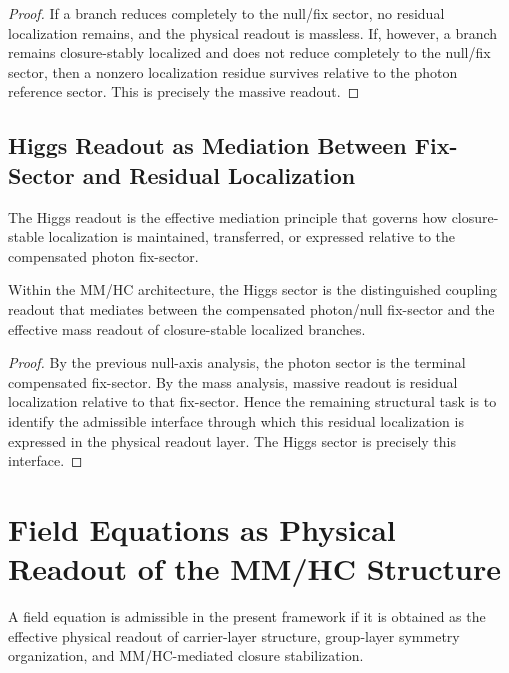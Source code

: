 \begin{proof}
If a branch reduces completely to the null/fix sector, no residual
localization remains, and the physical readout is massless. If, however, a
branch remains closure-stably localized and does not reduce completely to the
null/fix sector, then a nonzero localization residue survives relative to the
photon reference sector. This is precisely the massive readout.
\end{proof}

\subsection{Higgs Readout as Mediation Between Fix-Sector and Residual Localization}
\label{subsec:higgs-fix-localization}

\begin{definition}
\label{def:higgs-mediation}
The Higgs readout is the effective mediation principle that governs how
closure-stable localization is maintained, transferred, or expressed relative
to the compensated photon fix-sector.
\end{definition}

\begin{theorem}
\label{thm:higgs-role-refined}
Within the MM/HC architecture, the Higgs sector is the distinguished coupling
readout that mediates between the compensated photon/null fix-sector and the
effective mass readout of closure-stable localized branches.
\end{theorem}

\begin{proof}
By the previous null-axis analysis, the photon sector is the terminal
compensated fix-sector. By the mass analysis, massive readout is residual
localization relative to that fix-sector. Hence the remaining structural task
is to identify the admissible interface through which this residual
localization is expressed in the physical readout layer. The Higgs sector is
precisely this interface.
\end{proof}

\section{Field Equations as Physical Readout of the MM/HC Structure}
\label{sec:field-readout}

\begin{definition}
\label{def:field-readout-principle}
A field equation is admissible in the present framework if it is obtained as
the effective physical readout of carrier-layer structure, group-layer symmetry
organization, and MM/HC-mediated closure stabilization.
\end{definition}

